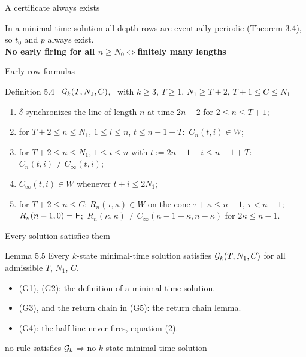 \begin{frame}{A certificate always exists}
\vspace{5ex}
\begin{center}\large
In a minimal-time solution all depth rows are eventually periodic (Theorem 3.4),\\ so $t_0$ and $p$ always exist.\\[3ex]
\textbf{No early firing for all $n\ge N_0$}\quad$\Longleftrightarrow$\quad \textbf{finitely many lengths}
\end{center}
\end{frame}

\begin{frame}{Early-row formulas}
\begin{statement}{Definition 5.4 \ $\mathcal G_k(T,N_1,C)$, \ with $k\ge3$, $T\ge1$, $N_1\ge T+2$, $T+1\le C\le N_1$}\small
\begin{enumerate}[(G1)]
\item $\delta$ synchronizes the line of length $n$ at time $2n-2$ for $2\le n\le T+1$;
\item for $T+2\le n\le N_1$, $1\le i\le n$, $t\le n-1+T$:\ $C_n(t,i)\in W$;
\item for $T+2\le n\le N_1$, $1\le i\le n$ with $t:=2n-1-i\le n-1+T$:\ $C_n(t,i)\ne C_\infty(t,i)$;
\item $C_\infty(t,i)\in W$ whenever $t+i\le 2N_1$;
\item for $T+2\le n\le C$: $R_n(\tau,\kappa)\in W$ on the cone $\tau+\kappa\le n-1$, $\tau<n-1$;\ $R_n(n-1,0)=\mathsf F$;\ $R_n(\kappa,\kappa)\ne C_\infty(n-1+\kappa,n-\kappa)$ for $2\kappa\le n-1$.
\end{enumerate}
\end{statement}
\end{frame}

\begin{frame}{Every solution satisfies them}
\vspace{2ex}
\begin{statement}{Lemma 5.5}
Every $k$-state minimal-time solution satisfies $\mathcal G_k(T,N_1,C)$ for all admissible $T$, $N_1$, $C$.
\end{statement}
\vspace{1ex}
\begin{itemize}
\item (G1), (G2): the definition of a minimal-time solution.
\item (G3), and the return chain in (G5): the return chain lemma.
\item (G4): the half-line never fires, equation (2).
\end{itemize}
\vspace{1ex}
\begin{center}no rule satisfies $\mathcal G_k$\quad$\Rightarrow$\quad no $k$-state minimal-time solution\end{center}
\end{frame}

